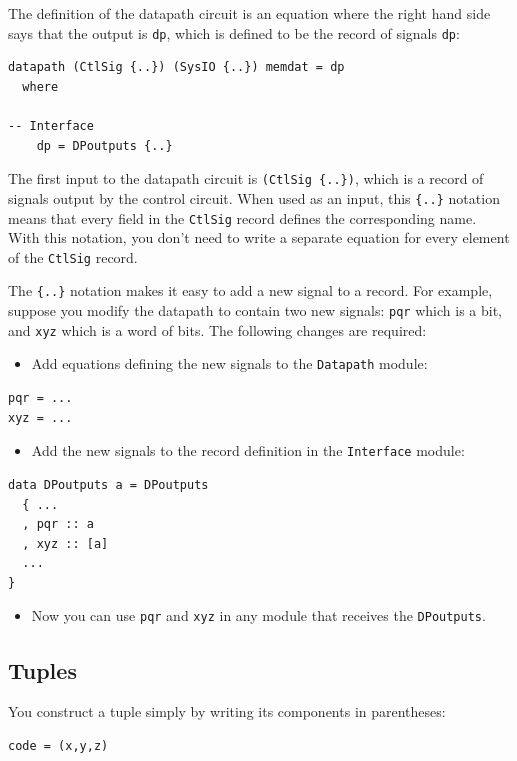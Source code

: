 \documentclass[]{svmono}
\begin{document}
The definition of the datapath circuit is an equation where the
right hand side says that the output is \texttt{dp}, which is defined to be
the record of signals \texttt{dp}:

\begin{verbatim}
datapath (CtlSig {..}) (SysIO {..}) memdat = dp
  where

-- Interface
    dp = DPoutputs {..}
\end{verbatim}

The first input to the datapath circuit is \texttt{(CtlSig \{..\})}, which is
a record of signals output by the control circuit.  When used as an
input, this \texttt{\{..\}} notation means that every field in the \texttt{CtlSig}
record defines the corresponding name.  With this notation, you
don't need to write a separate equation for every element of the
\texttt{CtlSig} record.

The \texttt{\{..\}} notation makes it easy to add a new signal to a record.
For example, suppose you modify the datapath to contain two new
signals: \texttt{pqr} which is a bit, and \texttt{xyz} which is a word of bits.
The following changes are required:
\begin{itemize}
\item Add equations defining the new signals to the \texttt{Datapath} module:
\end{itemize}
\begin{verbatim}
pqr = ...
xyz = ...
\end{verbatim}
\begin{itemize}
\item Add the new signals to the record definition in the \texttt{Interface}
module:
\end{itemize}
\begin{verbatim}
data DPoutputs a = DPoutputs
  { ...
  , pqr :: a
  , xyz :: [a]
  ...
}
\end{verbatim}
\begin{itemize}
\item Now you can use \texttt{pqr} and \texttt{xyz} in any module that receives the
\texttt{DPoutputs}.
\end{itemize}
\subsection*{Tuples}
\label{sec:org09a834e}

You construct a tuple simply by writing its components in
parentheses:

\begin{verbatim}
code = (x,y,z)
\end{verbatim}
\end{document}
